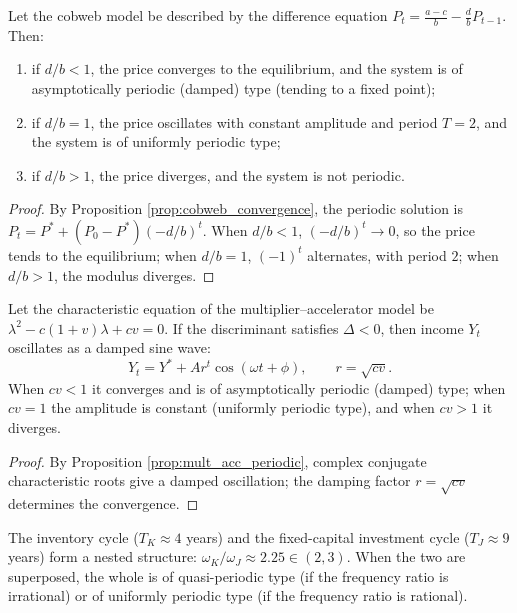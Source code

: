 \begin{lemma}\label{lem:econ_cobweb_periodic}
Let the cobweb model be described by the difference equation $P_t = \frac{a-c}{b} - \frac{d}{b}P_{t-1}$. Then:
\begin{enumerate}[label=(\roman*)]
    \item if $d/b<1$, the price converges to the equilibrium, and the system is of asymptotically periodic (damped) type (tending to a fixed point);
    \item if $d/b=1$, the price oscillates with constant amplitude and period $T=2$, and the system is of uniformly periodic type;
    \item if $d/b>1$, the price diverges, and the system is not periodic.
\end{enumerate}
\end{lemma}

\begin{proof}
By Proposition \ref{prop:cobweb_convergence}, the periodic solution is $P_t=P^*+(P_0-P^*)(-d/b)^t$. When $d/b<1$, $(-d/b)^t\to0$, so the price tends to the equilibrium; when $d/b=1$, $(-1)^t$ alternates, with period $2$; when $d/b>1$, the modulus diverges.
\end{proof}

\begin{lemma}\label{lem:econ_mult_acc_periodic}
Let the characteristic equation of the multiplier--accelerator model be $\lambda^2-c(1+v)\lambda+cv=0$. If the discriminant satisfies $\Delta<0$, then income $Y_t$ oscillates as a damped sine wave:
\[
Y_t=Y^*+Ar^t\cos(\omega t+\phi),\qquad r=\sqrt{cv}.
\]
When $cv<1$ it converges and is of asymptotically periodic (damped) type; when $cv=1$ the amplitude is constant (uniformly periodic type), and when $cv>1$ it diverges.
\end{lemma}

\begin{proof}
By Proposition \ref{prop:mult_acc_periodic}, complex conjugate characteristic roots give a damped oscillation; the damping factor $r=\sqrt{cv}$ determines the convergence.
\end{proof}

\begin{lemma}\label{lem:econ_nested_business_cycles}
The inventory cycle ($T_K\approx4$ years) and the fixed-capital investment cycle ($T_J\approx9$ years) form a nested structure: $\omega_K/\omega_J\approx2.25\in(2,3)$. When the two are superposed, the whole is of quasi-periodic type (if the frequency ratio is irrational) or of uniformly periodic type (if the frequency ratio is rational).
\end{lemma}

